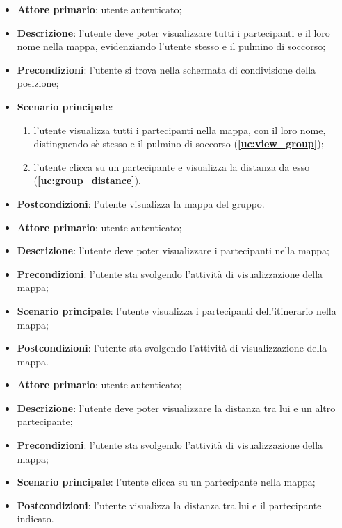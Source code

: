 \label{uc:vis_map}
\begin{itemize}
	\item \textbf{Attore primario}: utente autenticato;
	\item \textbf{Descrizione}: l'utente deve poter visualizzare tutti i partecipanti e il loro nome nella mappa, evidenziando l'utente stesso e il pulmino di soccorso;
    \item \textbf{Precondizioni}: l'utente si trova nella schermata di condivisione della posizione;
	\item \textbf{Scenario principale}:
    \begin{enumerate}
        \item l'utente visualizza tutti i partecipanti nella mappa, con il loro nome, distinguendo sè stesso e il pulmino di soccorso (\textbf{\ref{uc:view_group}});
        \item l'utente clicca su un partecipante e visualizza la distanza da esso (\textbf{\ref{uc:group_distance}}).
    \end{enumerate}
	\item \textbf{Postcondizioni}: l'utente visualizza la mappa del gruppo.
\end{itemize}

\label{uc:view_group}
\begin{itemize}
	\item \textbf{Attore primario}: utente autenticato;
	\item \textbf{Descrizione}: l'utente deve poter visualizzare i partecipanti nella mappa;
	\item \textbf{Precondizioni}: l'utente sta svolgendo l'attività di visualizzazione della mappa;
	\item \textbf{Scenario principale}: l'utente visualizza i partecipanti dell'itinerario nella mappa;
	\item \textbf{Postcondizioni}: l'utente sta svolgendo l'attività di visualizzazione della mappa.
\end{itemize}

\label{uc:group_distance}
\begin{itemize}
	\item \textbf{Attore primario}: utente autenticato;
	\item \textbf{Descrizione}: l'utente deve poter visualizzare la distanza tra lui e un altro partecipante;
	\item \textbf{Precondizioni}: l'utente sta svolgendo l'attività di visualizzazione della mappa;
	\item \textbf{Scenario principale}: l'utente clicca su un partecipante nella mappa;
	\item \textbf{Postcondizioni}: l'utente visualizza la distanza tra lui e il partecipante indicato.
\end{itemize}

